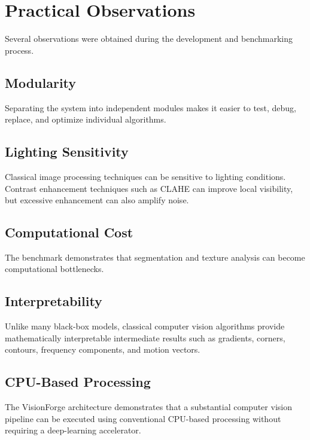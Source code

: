 \documentclass[11pt,a4paper]{article}
\begin{document}

\section{Practical Observations}

Several observations were obtained during the development and benchmarking process.

\subsection{Modularity}

Separating the system into independent modules makes it easier to test, debug, replace, and optimize individual algorithms.

\subsection{Lighting Sensitivity}

Classical image processing techniques can be sensitive to lighting conditions. Contrast enhancement techniques such as CLAHE can improve local visibility, but excessive enhancement can also amplify noise.

\subsection{Computational Cost}

The benchmark demonstrates that segmentation and texture analysis can become computational bottlenecks.

\subsection{Interpretability}

Unlike many black-box models, classical computer vision algorithms provide mathematically interpretable intermediate results such as gradients, corners, contours, frequency components, and motion vectors.

\subsection{CPU-Based Processing}

The VisionForge architecture demonstrates that a substantial computer vision pipeline can be executed using conventional CPU-based processing without requiring a deep-learning accelerator.
\end{document}
